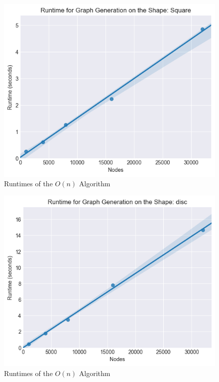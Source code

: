 \documentclass{article}
\begin{document}
  \begin{figure}[H]
    \centering
    \includegraphics[width=1 \textwidth]{square/runtime/runtime_chart}
    \caption{Runtimes of the $O(n)$ Algorithm}
  \end{figure}

  \begin{figure}[H]
    \centering
    \includegraphics[width=1 \textwidth]{disc/runtime/runtime_chart}
    \caption{Runtimes of the $O(n)$ Algorithm}
  \end{figure}

\printbibliography
\end{document}

